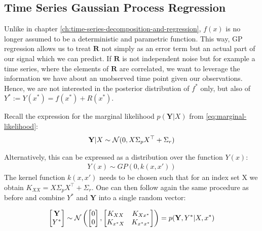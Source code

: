 \subsection{Time Series Gaussian Process Regression}

Unlike in chapter \ref{ch:time-series-decomposition-and-regression}, $f(x)$ is no longer assumed to be a
deterministic and parametric function.
This way, GP regression allows us to treat $\mathbf{R}$ not simply as an error
term but an actual part of our signal which we can predict. If $\mathbf{R}$ is not independent noise but for example a
time series, where the elements of $\mathbf{R}$ are correlated, we want to leverage the information we have about an
unobserved time point given our observations.
Hence, we are not interested in the posterior distribution of $f^{\ast}$ only, but also of
$Y^{\ast} := Y(x^{\ast}) = f(x^{\ast}) + R(x^{\ast})$.

Recall the expression for the marginal likelihood $p(\mathbf{Y}| X)$ from \ref{eq:marginal-likelihood}:
\begin{gather*}
    \mathbf{Y}|X \sim \operatorname{\mathcal{N}}(0,  X \Sigma_p X^{\top} + \Sigma_r) \\
\end{gather*}

Alternatively, this can be expressed as a distribution over the function $Y(x)$:
\begin{gather*}
    Y(x) \sim GP(0, k(x, x'))
\end{gather*}
The kernel function $k(x,x')$ needs to be chosen such that for an index set X we obtain $K_{XX} =  X \Sigma_p X^{\top} + \Sigma_r$.
One can then follow again the same procedure as before and combine $Y^{\ast}$ and $\mathbf{Y}$ into a single random vector:

\begin{gather}
    \begin{bmatrix}
        \mathbf{Y} \\
        Y^{\ast}
    \end{bmatrix}
    \sim \operatorname{\mathcal{N}} \left(
        \begin{bmatrix}
        0 \\
        0
        \end{bmatrix},
        \begin{bmatrix}
        K_{XX} & K_{Xx^{\ast}} \\
        K_{x^{\ast}X} & K_{x^{\ast}x^{\ast}}
        \end{bmatrix}
        \right)
    = p(\mathbf{Y}, Y^{\ast}| X, x^{\ast})
\end{gather}

